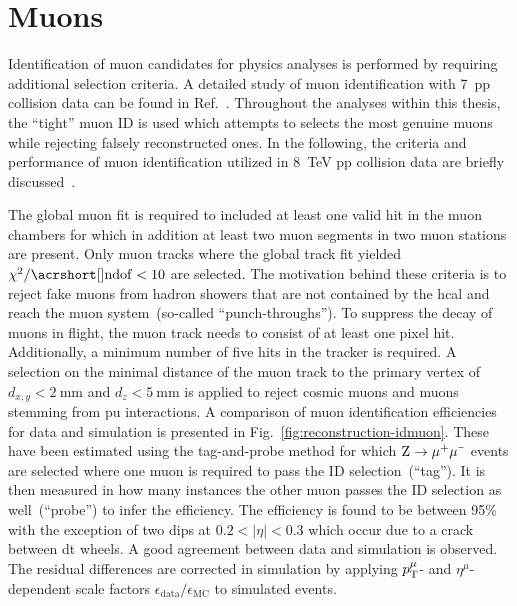 \section{Muons}
\label{sec:reconstruction-muons}

Identification of muon candidates for physics analyses is performed by requiring additional selection criteria. A detailed study of muon identification with 7~\TeV \gls{pp} collision data can be found in Ref.~\cite{Chatrchyan:2012xi}. Throughout the analyses within this thesis, the ``tight'' muon ID is used which attempts to selects the most genuine muons while rejecting falsely reconstructed ones. In the following, the criteria and performance of muon identification utilized in 8~TeV \gls{pp} collision data are briefly discussed~\cite{CMS-DP-2013-009}.

The global muon fit is required to included at least one valid hit in the muon chambers for which in addition at least two muon segments in two muon stations are present. Only muon tracks where the global track fit yielded $\chi^2/\mathrm{\gls{ndof}}<10$ are selected. The motivation behind these criteria is to reject fake muons from hadron showers that are not contained by the \gls{hcal} and reach the muon system~(so-called ``punch-throughs''). To suppress the decay of muons in flight, the muon track needs to consist of at least one pixel hit. Additionally, a minimum number of five hits in the tracker is required. A selection on the minimal distance of the muon track to the primary vertex of $d_{x,y}<2~\mathrm{mm}$ and $d_{z}<5~\mathrm{mm}$ is applied to reject cosmic muons and muons stemming from \gls{pu} interactions. A comparison of muon identification efficiencies for data and simulation is presented in Fig.~\ref{fig:reconstruction-idmuon}. These have been estimated using the tag-and-probe method for which $\mathrm{Z}\to\mu^{\rmplus}\mu^{\rmminus}$ events are selected where one muon is required to pass the ID selection~(``tag''). It is then measured in how many instances the other muon passes the ID selection as well~(``probe'') to infer the efficiency. The efficiency is found to be between 95\% with the exception of two dips at $0.2<|\eta|<0.3$ which occur due to a crack between \gls{dt} wheels. A good agreement between data and simulation is observed. The residual differences are corrected in simulation by applying $p_\textrm{T}^{\mu}$- and $\eta^{\mu}$-dependent scale factors $\epsilon_\mathrm{data}/\epsilon_\mathrm{MC}$ to simulated events.

